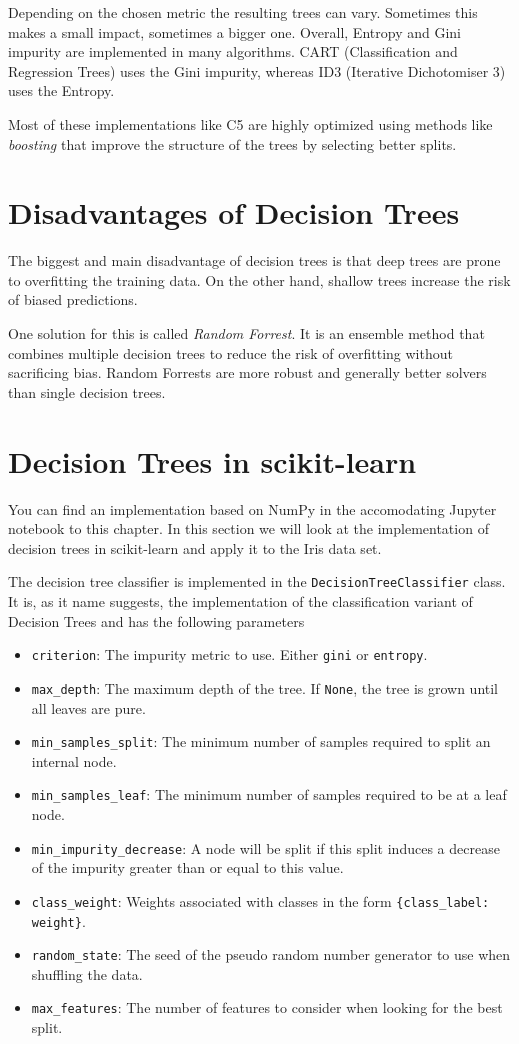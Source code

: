 Depending on the chosen metric the resulting trees can vary. Sometimes this makes a small impact,
sometimes a bigger one. Overall, Entropy and Gini impurity are implemented in many algorithms.
CART (Classification and Regression Trees) uses the Gini impurity, whereas ID3 (Iterative Dichotomiser 3) uses the Entropy.

Most of these implementations like C5 are highly optimized using methods like \textit{boosting}
 that improve the structure of the trees by selecting better splits.

\section{Disadvantages of Decision Trees}
The biggest and main disadvantage of decision trees is that deep trees are prone to overfitting the training data. On the other hand, shallow trees increase the risk of biased predictions.

One solution for this is called \textit{Random Forrest}. It is an ensemble method that combines multiple decision trees to reduce the risk of overfitting without sacrificing bias.
Random Forrests are more robust and generally better solvers than single decision trees.


\section{Decision Trees in scikit-learn}
You can find an implementation based on NumPy in the accomodating Jupyter notebook to this chapter.
In this section we will look at the implementation of decision trees in scikit-learn and apply it to the Iris data set.

The decision tree classifier is implemented in the \texttt{DecisionTreeClassifier} class.
It is, as it name suggests, the implementation of the classification variant of Decision Trees and has the following parameters
\begin{itemize}
  \item \texttt{criterion}: The impurity metric to use. Either \texttt{gini} or \texttt{entropy}.
  \item \texttt{max\_depth}: The maximum depth of the tree. If \texttt{None}, the tree is grown until all leaves are pure.
  \item \texttt{min\_samples\_split}: The minimum number of samples required to split an internal node.
  \item \texttt{min\_samples\_leaf}: The minimum number of samples required to be at a leaf node.
  \item \texttt{min\_impurity\_decrease}: A node will be split if this split induces a decrease of the impurity greater than or equal to this value.
  \item \texttt{class\_weight}: Weights associated with classes in the form \texttt{\{class\_label: weight\}}.
  \item \texttt{random\_state}: The seed of the pseudo random number generator to use when shuffling the data.
  \item \texttt{max\_features}: The number of features to consider when looking for the best split.
\end{itemize}

